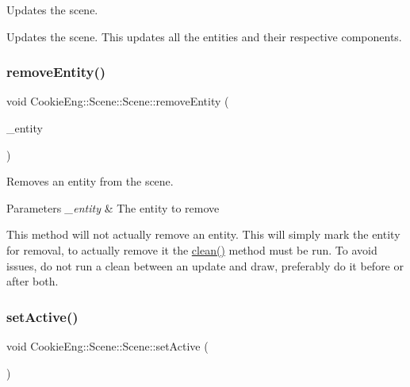 Updates the scene. 

Updates the scene. This updates all the entities and their respective components. \mbox{\label{class_cookie_eng_1_1_scene_1_1_scene_aefa43f3ce579fe9798870c95d92711db}} 
\subsubsection{\texorpdfstring{remove\+Entity()}{removeEntity()}}
{\footnotesize\ttfamily void Cookie\+Eng\+::\+Scene\+::\+Scene\+::remove\+Entity (\begin{DoxyParamCaption}\item[{std\+::shared\+\_\+ptr$<$ \hyperlink{class_cookie_eng_1_1_e_c_s_1_1_entity}{E\+C\+S\+::\+Entity} $>$}]{\+\_\+entity }\end{DoxyParamCaption})}



Removes an entity from the scene. 


\begin{DoxyParams}{Parameters}
{\em \+\_\+entity} & The entity to remove\\
\hline
\end{DoxyParams}
This method will not actually remove an entity. This will simply mark the entity for removal, to actually remove it the \hyperlink{class_cookie_eng_1_1_scene_1_1_scene_a3e1fa17bfd8e0e3af72db05c7a5ae0b3}{clean()} method must be run. To avoid issues, do not run a clean between an update and draw, preferably do it before or after both. \mbox{\label{class_cookie_eng_1_1_scene_1_1_scene_adca281b1bff287a62391b5bb8bc18f5c}} 
\subsubsection{\texorpdfstring{set\+Active()}{setActive()}}
{\footnotesize\ttfamily void Cookie\+Eng\+::\+Scene\+::\+Scene\+::set\+Active (\begin{DoxyParamCaption}{ }\end{DoxyParamCaption})\hspace{0.3cm}{\ttfamily [inline]}}



